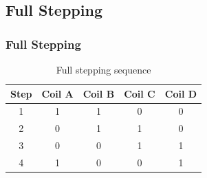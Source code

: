 \documentclass[table,10pt,red]{beamer}	%
\begin{document}
\subsection{Full Stepping}

\begin{frame}
	\frametitle{Full Stepping}
	\pause
	\begin{table}
		\begin{tabular}{c c c c c}
			\toprule
			\textbf{Step} & \textbf{Coil A} & \textbf{Coil B} & \textbf{Coil C} & \textbf{Coil D}\\
			\midrule
			1 & 1 & 1 & 0 & 0 \\
			2 & 0 & 1 & 1 & 0 \\
			3 & 0 & 0 & 1 & 1 \\
			4 & 1 & 0 & 0 & 1 \\
			\bottomrule
		\end{tabular}
		\caption{Full stepping sequence}
	\end{table}
\end{frame}
\end{document}
